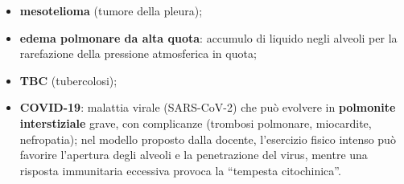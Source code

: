 \begin{itemize}
  \item \textbf{mesotelioma} (tumore della pleura);
  \item \textbf{edema polmonare da alta quota}: accumulo di liquido negli alveoli per la rarefazione
    della pressione atmosferica in quota;
  \item \textbf{TBC} (tubercolosi);
  \item \textbf{COVID-19}: malattia virale (SARS-CoV-2) che può evolvere in \textbf{polmonite
    interstiziale} grave, con complicanze (trombosi polmonare, miocardite, nefropatia); nel modello
    proposto dalla docente, l'esercizio fisico intenso può favorire l'apertura degli alveoli e la
    penetrazione del virus, mentre una risposta immunitaria eccessiva provoca la ``tempesta
    citochinica''.
\end{itemize}
